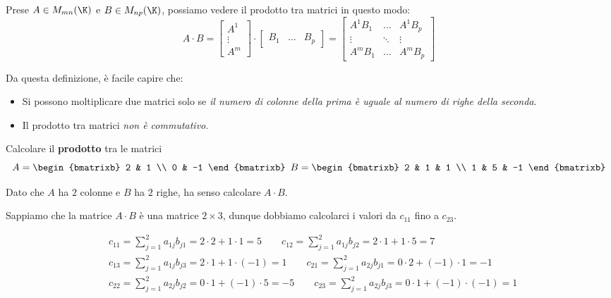 \documentclass[11pt, a4paper, titlepage, oneside]{scrbook}
\begin{document}
Prese $A \in M_{mn}(\K)$ e $B \in M_{np}(\K)$, possiamo vedere il prodotto tra matrici in questo modo:
\[A \cdot B = \begin{bmatrix}
    A^1 \\ \vdots \\ A^m
\end{bmatrix} \cdot \begin{bmatrix}
    B_1 & \dots & B_p
\end{bmatrix} = \begin{bmatrix}
    A^1B_1 & \dots & A^1 B_p \\
    \vdots & \ddots & \vdots \\
    A^m B_1 & \dots & A^m B_p
\end{bmatrix}\]

Da questa definizione, è facile capire che:
\begin{itemize}
    \item Si possono moltiplicare due matrici solo se \textit{il numero di colonne della prima è uguale al numero di righe della seconda}.
    \item Il prodotto tra matrici \textit{non è commutativo}.
\end{itemize}

\Esempio \nopagebreak

Calcolare il \textbf{prodotto} tra le matrici \nopagebreak
\[A =
\begin{bmatrixb}
2 & 1  \\
0 & -1
\end{bmatrixb}
\enspace 
B =
\begin{bmatrixb}
2 & 1 & 1 \\
1 & 5 & -1
\end{bmatrixb}
\]

Dato che $A$ ha $2$ colonne e $B$ ha $2$ righe, ha senso calcolare $A \cdot B$. 

Sappiamo che la matrice $A \cdot B$ è una matrice $2 \times 3$, dunque dobbiamo calcolarci i valori da $c_{11}$ fino a $c_{23}$.

\begin{align*}
&c_{11} = \sum_{j = 1}^2 a_{1j} b_{j1} = 2 \cdot 2 + 1 \cdot 1 = 5  \qquad c_{12} = \sum_{j = 1}^2 a_{1j} b_{j2} = 2 \cdot 1 + 1 \cdot 5 = 7 \\
&c_{13} = \sum_{j = 1}^2 a_{1j} b_{j3} = 2 \cdot 1 + 1 \cdot (-1) = 1 \qquad c_{21} = \sum_{j = 1}^2 a_{2j} b_{j1} = 0 \cdot 2 + (-1) \cdot 1 = -1 \\
&c_{22} = \sum_{j = 1}^2 a_{2j} b_{j2} = 0 \cdot 1 + (-1) \cdot 5 = -5 \qquad c_{23} = \sum_{j = 1}^2 a_{2j} b_{j3} = 0 \cdot 1 + (-1) \cdot (-1) = 1
\end{align*}
\end{document}
